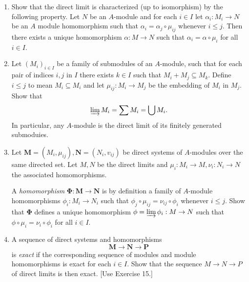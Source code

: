 \documentclass{standalone}
\theoremstyle{definition}
\theoremstyle{remark}
\begin{document}
\begin{enumerate}[resume*=exc2]
  \item Show that the direct limit is characterized (up to isomorphism) by the
        following property. Let $N$ be an $A$-module and for each $i \in I$ let
        $\alpha_{i}: M_{i} \to N$ be an $A$ module homomorphism such that
        $\alpha_{i}=\alpha_{j} \circ \mu_{ij}$ whenever $i \leq j$. Then
        there exists a unique homomorphism $\alpha: M \to N$ such that
        $\alpha_{i}=\alpha \circ \mu_{i}$ for all $i \in I$.

  \item Let $(M_{i})_{i \in I}$ be a family of submodules of an
        $A$-module, such that for each pair of indices $i, j$ in $I$ there
        exists $k \in I$ such that $M_{i}+M_{j} \subseteq M_{k}$. Define
        $i \leq j$ to mean $M_{i} \subseteq M_{i}$ and let
        $\mu_{i j}: M_{i} \to M_{j}$ be the embedding of $M_{i}$ in $M_{j}$.
        Show that
\[
  \varinjlim M_{i}=\sum M_{i}=\bigcup M_{i}.
\]
In particular, any $A$-module is the direct limit of its finitely generated
submoduies.
  \item Let
        $\mathbf{M}=(M_{i}, \mu_{i j}), \mathbf{N}=(N_{i}, v_{i j})$
        be direct systems of $A$-modules over the same directed set. Let $M, N$
        be the direct limits and $\mu_{i}: M_{i} \to M, \nu_{i}: N_{i} \to N$
        the associated homomorphisms.
        
A {\itshape homomorphism} $\symbf{\Phi}: \mathbf{M} \to \mathbf{N}$ is by definition a
family of $A$-module homomorphisms $\phi_{i}: M_{i} \to N_{i}$ such that
$\phi_{j} \circ \mu_{i j}=\nu_{i j} \circ \phi_{i}$ whenever $i \leq j$. Show
that $\symbf{\Phi}$ defines a unique homomorphism
$\phi=\varinjlim \phi_{i}: M \to N$ such that $\phi \circ
\mu_{i}=\nu_{i} \circ \phi_{i}$ for all $i \in I$. 
  \item A sequence of direct systems and homomorphisms
\[
  \mathbf{M} \to \mathbf{N} \to \mathbf{P}
\]
is {\itshape exact} if the corresponding sequence of modules and module homomorphisms is
exact for each $i \in I$. Show that the sequence $M \to N \to P$ of direct
limits is then exact. [Use Exercise 15.]
\end{enumerate}
\end{document}
